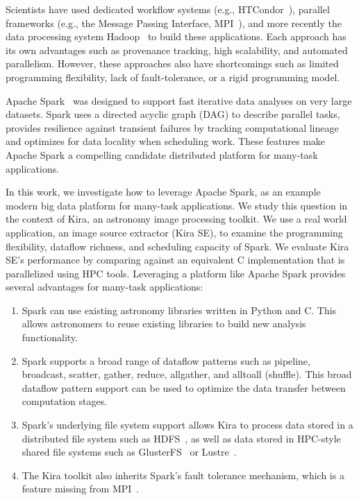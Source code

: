 \documentclass[10pt,journal,compsoc]{IEEEtran}
\begin{document}
Scientists have used dedicated workflow systems (e.g., HTCondor~\cite{litzkow88}), parallel frameworks (e.g., the Message Passing Interface, MPI~\cite{gropp96}), and more recently the data processing system Hadoop~\cite{HADOOP}  to build these applications. Each approach has its own advantages such as provenance tracking, high scalability, and automated parallelism. However, these approaches also have shortcomings such as limited programming flexibility, lack of fault-tolerance, or a rigid programming model.


Apache Spark~\cite{zaharia12} was designed to support fast iterative data analyses on very large datasets.
Spark uses a directed acyclic graph (DAG) to describe parallel tasks, 
provides resilience against transient failures by tracking computational lineage
and optimizes for data locality when scheduling work.
These features make Apache Spark a compelling candidate distributed platform for many-task applications.

In this work, we investigate how to leverage Apache Spark,  as an example modern big data platform for many-task applications.
We study this question in the context of Kira, an astronomy image processing toolkit.
We use a real world application, an image source extractor (Kira SE), to examine the programming flexibility, dataflow richness,
and scheduling capacity of Spark. We evaluate Kira SE's performance by comparing against
an equivalent C implementation that is parallelized using HPC tools. Leveraging a platform like Apache Spark provides several advantages for many-task applications:
\begin{enumerate}
\item Spark can use existing astronomy libraries written in Python and C.
This allows astronomers to reuse existing libraries to build new analysis functionality.
\item Spark supports a broad range of dataflow patterns such as pipeline, broadcast, scatter, gather, reduce, allgather, 
and alltoall (shuffle). This broad dataflow pattern support can be used to optimize the data transfer between computation stages.
\item Spark's underlying file system support allows Kira to process data stored in a distributed file system such as HDFS~\cite{shvachko10}, 
as well as data stored in HPC-style shared file systems such as GlusterFS~\cite{davies13} or Lustre~\cite{donovan03}.
\item The Kira toolkit also inherits Spark's fault tolerance mechanism, which is a feature missing from MPI~\cite{gropp96}.
\end{enumerate}
\end{document}
